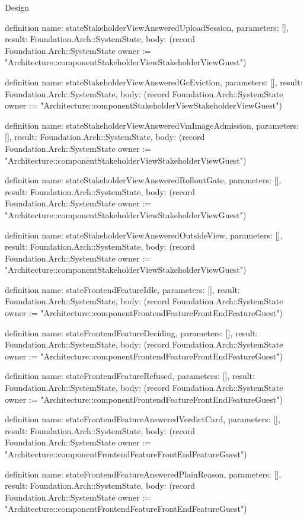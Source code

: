 \begin{lexlean}{Design}
\begin{semanticmodule}
definition{
  name: stateStakeholderViewAnsweredUploadSession,
  parameters: [],
  result: Foundation.Arch::SystemState,
  body: (record Foundation.Arch::SystemState {owner := "Architecture::componentStakeholderViewStakeholderViewGuest"})
}

definition{
  name: stateStakeholderViewAnsweredGcEviction,
  parameters: [],
  result: Foundation.Arch::SystemState,
  body: (record Foundation.Arch::SystemState {owner := "Architecture::componentStakeholderViewStakeholderViewGuest"})
}

definition{
  name: stateStakeholderViewAnsweredVmImageAdmission,
  parameters: [],
  result: Foundation.Arch::SystemState,
  body: (record Foundation.Arch::SystemState {owner := "Architecture::componentStakeholderViewStakeholderViewGuest"})
}

definition{
  name: stateStakeholderViewAnsweredRolloutGate,
  parameters: [],
  result: Foundation.Arch::SystemState,
  body: (record Foundation.Arch::SystemState {owner := "Architecture::componentStakeholderViewStakeholderViewGuest"})
}

definition{
  name: stateStakeholderViewAnsweredOutsideView,
  parameters: [],
  result: Foundation.Arch::SystemState,
  body: (record Foundation.Arch::SystemState {owner := "Architecture::componentStakeholderViewStakeholderViewGuest"})
}

definition{
  name: stateFrontendFeatureIdle,
  parameters: [],
  result: Foundation.Arch::SystemState,
  body: (record Foundation.Arch::SystemState {owner := "Architecture::componentFrontendFeatureFrontEndFeatureGuest"})
}

definition{
  name: stateFrontendFeatureDeciding,
  parameters: [],
  result: Foundation.Arch::SystemState,
  body: (record Foundation.Arch::SystemState {owner := "Architecture::componentFrontendFeatureFrontEndFeatureGuest"})
}

definition{
  name: stateFrontendFeatureRefused,
  parameters: [],
  result: Foundation.Arch::SystemState,
  body: (record Foundation.Arch::SystemState {owner := "Architecture::componentFrontendFeatureFrontEndFeatureGuest"})
}

definition{
  name: stateFrontendFeatureAnsweredVerdictCard,
  parameters: [],
  result: Foundation.Arch::SystemState,
  body: (record Foundation.Arch::SystemState {owner := "Architecture::componentFrontendFeatureFrontEndFeatureGuest"})
}

definition{
  name: stateFrontendFeatureAnsweredPlainReason,
  parameters: [],
  result: Foundation.Arch::SystemState,
  body: (record Foundation.Arch::SystemState {owner := "Architecture::componentFrontendFeatureFrontEndFeatureGuest"})
}


\end{semanticmodule}
\end{lexlean}
